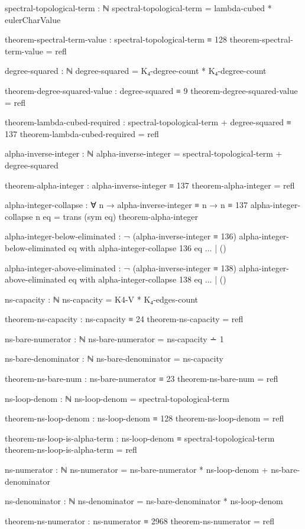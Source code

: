 \documentclass[11pt,a4paper]{book}
\begin{document}
\begin{code}
spectral-topological-term : ℕ
spectral-topological-term = lambda-cubed * eulerCharValue

theorem-spectral-term-value : spectral-topological-term ≡ 128
theorem-spectral-term-value = refl

degree-squared : ℕ
degree-squared = K₄-degree-count * K₄-degree-count

theorem-degree-squared-value : degree-squared ≡ 9
theorem-degree-squared-value = refl

theorem-lambda-cubed-required : spectral-topological-term + degree-squared ≡ 137
theorem-lambda-cubed-required = refl

alpha-inverse-integer : ℕ
alpha-inverse-integer = spectral-topological-term + degree-squared

theorem-alpha-integer : alpha-inverse-integer ≡ 137
theorem-alpha-integer = refl

alpha-integer-collapse : ∀ n → alpha-inverse-integer ≡ n → n ≡ 137
alpha-integer-collapse n eq = trans (sym eq) theorem-alpha-integer

alpha-integer-below-eliminated : ¬ (alpha-inverse-integer ≡ 136)
alpha-integer-below-eliminated eq with alpha-integer-collapse 136 eq
... | ()

alpha-integer-above-eliminated : ¬ (alpha-inverse-integer ≡ 138)
alpha-integer-above-eliminated eq with alpha-integer-collapse 138 eq
... | ()

ns-capacity : ℕ
ns-capacity = K4-V * K₄-edges-count

theorem-ns-capacity : ns-capacity ≡ 24
theorem-ns-capacity = refl

ns-bare-numerator : ℕ
ns-bare-numerator = ns-capacity ∸ 1

ns-bare-denominator : ℕ
ns-bare-denominator = ns-capacity

theorem-ns-bare-num : ns-bare-numerator ≡ 23
theorem-ns-bare-num = refl

ns-loop-denom : ℕ
ns-loop-denom = spectral-topological-term

theorem-ns-loop-denom : ns-loop-denom ≡ 128
theorem-ns-loop-denom = refl

theorem-ns-loop-is-alpha-term : ns-loop-denom ≡ spectral-topological-term
theorem-ns-loop-is-alpha-term = refl

ns-numerator : ℕ
ns-numerator = ns-bare-numerator * ns-loop-denom + ns-bare-denominator

ns-denominator : ℕ
ns-denominator = ns-bare-denominator * ns-loop-denom

theorem-ns-numerator : ns-numerator ≡ 2968
theorem-ns-numerator = refl


\end{code}
\end{document}
